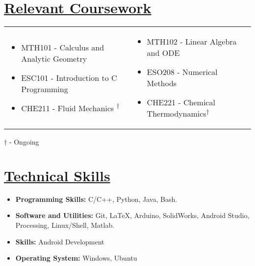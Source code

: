 \documentclass{article}
\begin{document}
\section*{\underline{Relevant Coursework}}

\begin{center}
\begin{tabular}{m{7.5cm}  m{7.5cm}}
 \begin{itemize}
\item MTH101 - Calculus and Analytic Geometry
\item ESC101 - Introduction to C Programming
\item CHE211 - Fluid Mechanics \textsuperscript{$\dagger$}
\end{itemize}
&
\begin{itemize}
\item MTH102 - Linear Algebra and ODE
\item ESO208 - Numerical Methods
\item CHE221 - Chemical Thermodynamics\textsuperscript{$\dagger$}
\end{itemize}
\end{tabular}

\begin{flushright}
    
    \small{$\dagger$ - Ongoing}
\end{flushright}
\end{center}


\section*{\underline{Technical Skills}}
\begin{itemize}
\item \textbf{Programming Skills: } C/C++, Python, Java, Bash. 
\item \textbf{Software and Utilities: } Git, \LaTeX, Arduino, SolidWorks, Android Studio, Processing, Linux/Shell, Matlab.
\item \textbf{Skills: } Android Development
\item \textbf{Operating System: } Windows, Ubuntu  
\end{itemize}
\end{document}
